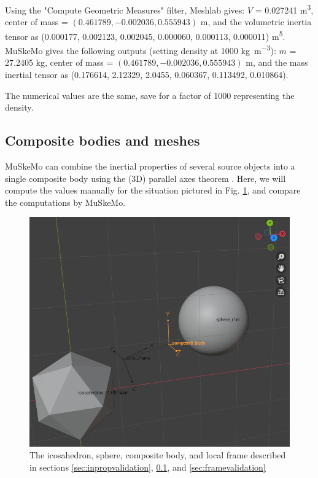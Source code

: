 \documentclass{article}
\begin{document}
Using the "Compute Geometric Measures" filter, Meshlab gives: \(V\) = 0.027241 \si{m^3}, center of mass = \((0.461789, -0.002036, 0.555943)\) \si{m}, and the volumetric inertia tensor as (0.000177, 0.002123, 0.002045, 0.000060, 0.000113, 0.000011) \si{m^5}. MuSkeMo gives the following outputs (setting density at 1000 \si{kg m^{-3}}): \(m\) = 27.2405 \si{kg}, center of mass = \((0.461789, -0.002036, 0.555943)\) \si{m}, and the mass inertial tensor as (0.176614, 2.12329, 2.0455, 0.060367, 0.113492, 0.010864).

The numerical values are the same, save for a factor of 1000 representing the density.

\subsection{Composite bodies and meshes}

\label{sec:compositebodyvalidation}

MuSkeMo can combine the inertial properties of several source objects into a single composite body using the (3D) parallel axes theorem \cite{valleryAdvancedDynamics2019,ruinaMechanicsToolsetStatics2019}. Here, we will compute the values manually for the situation pictured in Fig. \ref{fig:icoandsphere}, and compare the computations by MuSkeMo.


\begin{figure}[htbp]
    \centering
    \includegraphics[width=\textwidth]{figures/composite_body.png} %
    \caption{The icosahedron, sphere, composite body, and local frame described in sections \ref{sec:inpropvalidation}, \ref{sec:compositebodyvalidation}, and \ref{sec:framevalidation}}
    \label{fig:icoandsphere}
\end{figure}
\end{document}

